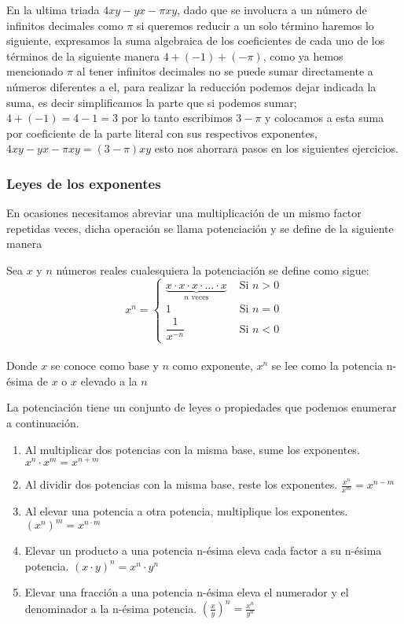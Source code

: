 \documentclass[11pt,letterpaper,oneside]{book}
\numberwithin{equation}{section}
\begin{document}
	En la ultima triada $4xy-yx-\pi xy$, dado que se involucra a un número de infinitos decimales como $\pi$ si queremos reducir a un solo término haremos lo siguiente, expresamos la suma algebraica de los coeficientes de cada uno de los términos de la siguiente manera $4+(-1)+(-\pi )$, como ya hemos mencionado $\pi$ al tener infinitos decimales no se puede sumar directamente a números diferentes a el, para realizar la reducción podemos dejar indicada la suma, es decir simplificamos la parte que si podemos sumar; $4+(-1)=4-1=3$ por lo tanto escribimos $3-\pi$ y colocamos a esta suma por coeficiente de la parte literal con sus respectivos exponentes, $4xy-yx-\pi xy = (3-\pi)xy$ esto nos ahorrara pasos en los siguientes ejercicios.
	
	\subsubsection{Leyes de los exponentes}
	
	\par En ocasiones necesitamos abreviar una multiplicación de un mismo factor repetidas veces, dicha operación se llama potenciación y se define de la siguiente manera
	
	\begin{definición}[Potenciación]
	Sea $x$ y $n$ números reales cualesquiera la potenciación se define como sigue:
		\begin{equation*}
		x^n = \left\lbrace
		\begin{array}{lc}
			\underbrace{x\cdot x \cdot x \cdot \ldots \cdot x }_{n \text{ veces}}& \text{ Si } n>0 \\
			1& \text{ Si } n=0 \\
			\dfrac{1}{x^{-n}}& \text{ Si } n<0
		\end{array} 
		\right. 
		\end{equation*} 
		\\
		Donde $x$ se conoce como base y $n$ como exponente, $x^n$ se lee como la potencia n-ésima de $x$ o $x$ elevado a la $n$
	\end{definición}
	
	\par
	La potenciación tiene un conjunto de leyes o propiedades que podemos enumerar a continuación.
	
	\begin{enumerate}[series=LE]
		\item Al multiplicar dos potencias con la misma base, sume los exponentes. $x^n \cdot x^m = x^{n+m} $
		\item Al dividir dos potencias con la misma base, reste los exponentes. $\frac{x^n}{x^m} = x^{n-m} $
		\item Al elevar una potencia a otra potencia, multiplique los exponentes. $(x^n)^m=x^{n \cdot m}$
		\item Elevar un producto a una potencia n-ésima eleva cada factor a su n-ésima potencia. $(x\cdot y)^n= x^n \cdot y^n$
		\item Elevar una fracción a una potencia n-ésima eleva el numerador y el denominador a la n-ésima potencia. $(\frac{x}{y})^n = \frac{x^n}{y^n}$
	\end{enumerate}
\end{document}
